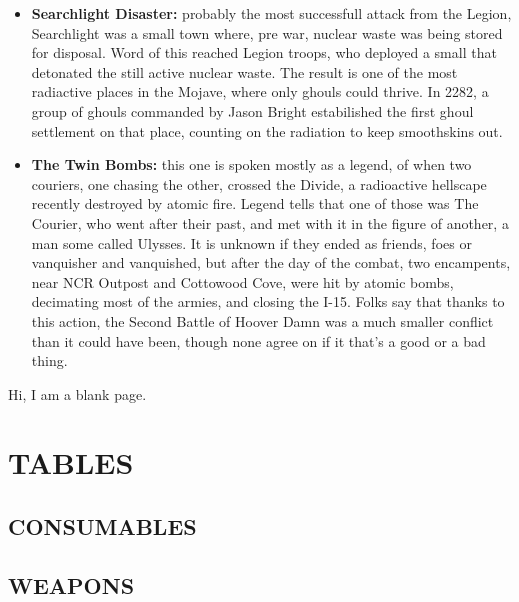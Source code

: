 \documentclass[11pt]{article} %
\begin{document}
\begin{itemize}
	\item \textbf{Searchlight Disaster:} probably the most successfull attack from the Legion, Searchlight was a small town where, pre war, nuclear waste was being stored for disposal. Word of this reached Legion troops, who deployed a small  that detonated the still active nuclear waste. The result is one of the most radiactive places in the Mojave, where only ghouls could thrive. In 2282, a group of ghouls commanded by Jason Bright estabilished the first ghoul settlement on that place, counting on the radiation to keep smoothskins out.
	
	\item \textbf{The Twin Bombs:} this one is spoken mostly as a legend, of when two couriers, one chasing the other, crossed the Divide, a radioactive hellscape recently destroyed by atomic fire. Legend tells that one of those was The Courier, who went after their past, and met with it in the figure of another, a man some called Ulysses. It is unknown if they ended as friends, foes or vanquisher and vanquished, but after the day of the combat, two encampents, near NCR Outpost and Cottowood Cove, were hit by atomic bombs, decimating most of the armies, and closing the I-15. Folks say that thanks to this action, the Second Battle of Hoover Damn was a much smaller conflict than it could have been, though none agree on if it that's a good or a bad thing.
\end{itemize}


\newpage
Hi, I am a blank page.
\newpage

\appendix
\addtolength{\oddsidemargin}{-0.9in}
\addtolength{\evensidemargin}{-0.9in}
\addtolength{\textwidth}{1.8in}
\section{TABLES}
	
	\label{app:traits}
	
	\label{app:perks}
	
\subsection{CONSUMABLES}
	
	
	
	\label{app:chems}
	
\newpage

\subsection{WEAPONS}
\label{app:weapons}
	
	
	
	
	
	
	
	
	
	
	
	
	
\newpage
\end{document}
